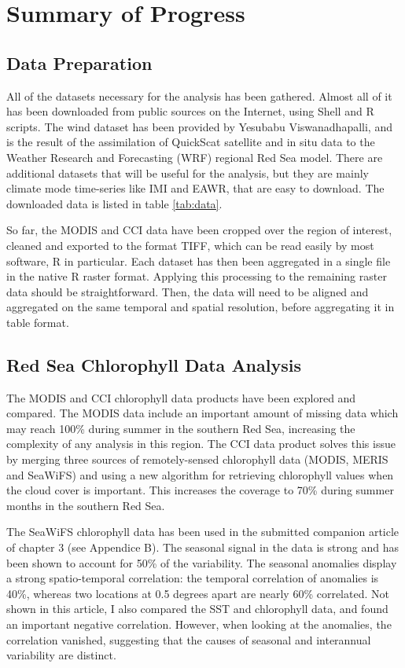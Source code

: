 \chapter{Summary of Progress}

\section{Data Preparation}

All of the datasets necessary for the analysis has been gathered. Almost all of
it has been downloaded from public sources on the Internet, using Shell and R
scripts.  The wind dataset has been provided by Yesubabu Viswanadhapalli, and
is the result of the assimilation of QuickScat satellite and in situ data to
the Weather Research and Forecasting (WRF) regional Red Sea model. There are
additional datasets that will be useful for the analysis, but they are mainly
climate mode time-series like IMI and EAWR, that are easy to download. The
downloaded data is listed in table \ref{tab:data}.

So far, the MODIS and CCI data have been cropped over the region of interest,
cleaned and exported to the format TIFF, which can be read easily by most
software, R in particular. Each dataset has then been aggregated in a single
file in the native R raster format. Applying this processing to the remaining
raster data should be straightforward. Then, the data will need to be aligned
and aggregated on the same temporal and spatial resolution, before aggregating
it in table format.



\section{Red Sea Chlorophyll Data Analysis}

The MODIS and CCI chlorophyll data products have been explored and compared.
The MODIS data include an important amount of missing data which may reach
100\% during summer in the southern Red Sea, increasing the complexity of any
analysis in this region. The CCI data product solves this issue by merging
three sources of remotely-sensed chlorophyll data (MODIS, MERIS and SeaWiFS)
and using a new algorithm for retrieving chlorophyll values when the cloud
cover is important.  This increases the coverage to 70\% during summer months
in the southern Red Sea.

The SeaWiFS chlorophyll data has been used in the submitted companion article
of chapter 3 (see Appendice B).  The seasonal signal in the data is strong and
has been shown to account for 50\% of the variability. The seasonal anomalies
display a strong spatio-temporal correlation: the temporal correlation of
anomalies is 40\%, whereas two locations at 0.5 degrees apart are nearly 60\%
correlated. Not shown in this article, I also compared the SST and chlorophyll
data, and found an important negative correlation. However, when looking at the
anomalies, the correlation vanished, suggesting that the causes of seasonal and
interannual variability are distinct.

